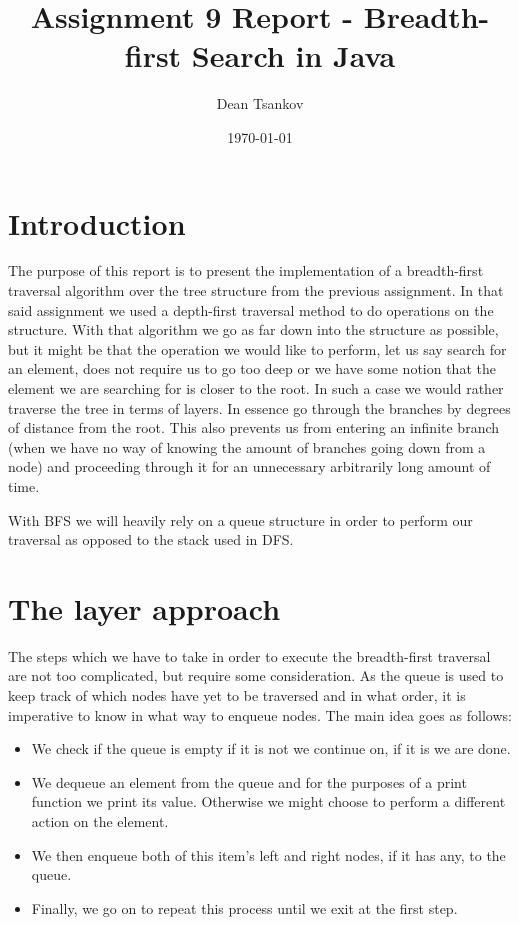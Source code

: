 \documentclass[a4paper,11pt]{article}
\begin{document}
\title{
    \textbf{Assignment 9 Report - Breadth-first Search in Java}
}
\author{Dean Tsankov}
\date{\today}

\maketitle

\section*{Introduction}

The purpose of this report is to present the implementation of a breadth-first traversal algorithm over the tree structure from the previous assignment. In that said assignment we used a depth-first traversal method to do operations on the structure. With that algorithm we go as far down into the structure as possible, but it might be that the operation we would like to perform, let us say search for an element, does not require us to go too deep or we have some notion that the element we are searching for is closer to the root. In such a case we would rather traverse the tree in terms of layers. In essence go through the branches by degrees of distance from the root. This also prevents us from entering an infinite branch (when we have no way of knowing the amount of branches going down from a node) and proceeding through it for an unnecessary arbitrarily long amount of time. 

With BFS we will heavily rely on a queue structure in order to perform our traversal as opposed to the stack used in DFS.

\section*{The layer approach}

The steps which we have to take in order to execute the breadth-first traversal are not too complicated, but require some consideration. As the queue is used to keep track of which nodes have yet to be traversed and in what order, it is imperative to know in what way to enqueue nodes. The main idea goes as follows:

\begin{itemize}
\item We check if the queue is empty if it is not we continue on, if it is we are done.
\item We dequeue an element from the queue and for the purposes of a print function we print its value. Otherwise we might choose to perform a different action on the element.
\item We then enqueue both of this item's left and right nodes, if it has any, to the queue.
\item Finally, we go on to repeat this process until we exit at the first step.
\end{itemize} 
\end{document}
